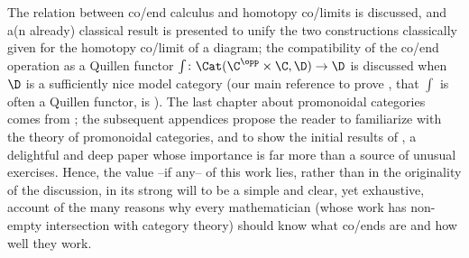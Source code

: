 The relation between co/end calculus and homotopy co/limits is discussed, and a(n already) classical result \cite{Gamb} is presented to unify the two constructions classically given for the homotopy co/limit of a diagram; the compatibility of the co/end operation as a Quillen functor $\int\colon \Cat(\C^\opp\times\C,\D)\to \D$ is discussed when $\D$ is a sufficiently nice model category (our main reference to prove , \ie that $\int$ is often a Quillen functor, is \cite[\textbf{A.2.9.28}]{HTT}).
The last chapter about promonoidal categories comes from \cite{day1974embedding, street2012monoidal}; the subsequent appendices propose the reader to familiarize with the theory of promonoidal categories, and to show the initial results of \cite[\S \textbf{1}-\textbf{3}]{day2011monoidal}, a delightful and deep paper whose importance is far more than a source of unusual exercises.
Hence, the value --if any-- of this work lies, rather than in the originality of the discussion, in its strong will to be a simple and clear, yet exhaustive, account of the many reasons why every mathematician (whose work has non\hyp{}empty intersection with category theory) should know what co/ends are and how well they work.

